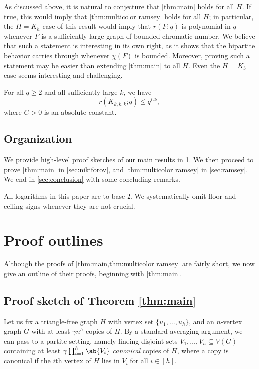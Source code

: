 As discussed above, it is natural to conjecture that \cref{thm:main} holds for all $H$. If true, this would imply that \cref{thm:multicolor ramsey} holds for all $H$; in particular, the $H=K_h$ case of this result would imply that $r(F;q)$ is polynomial in $q$ whenever $F$ is a sufficiently large graph of bounded chromatic number. We believe that such a statement is interesting in its own right, as it shows that the bipartite behavior carries through whenever $\chi(F)$ is bounded. Moreover, proving such a statement may be easier than extending \cref{thm:main} to all $H$. Even the $H=K_3$ case seems interesting and challenging.
\begin{conjecture}
    For all $q \geq 2$ and all sufficiently large $k$, we have
    \[
        r(K_{k,k,k};q) \leq q^{Ck},
    \]
    where $C>0$ is an absolute constant.
\end{conjecture}

\subsection{Organization}
We provide high-level proof sketches of our main results in \cref{sec:outlines}.
We then proceed to prove \cref{thm:main} in \cref{sec:nikiforov}, and \cref{thm:multicolor ramsey} in \cref{sec:ramsey}. We end in \cref{sec:conclusion} with some concluding remarks.

All logarithms in this paper are to base $2$. We systematically omit floor and ceiling signs whenever they are not crucial.

\section{Proof outlines}\label{sec:outlines}
Although the proofs of \cref{thm:main,thm:multicolor ramsey} are fairly short, we now give an outline of their proofs, beginning with \cref{thm:main}. 
\subsection{Proof sketch of Theorem \ref{thm:main}}
Let us fix a triangle-free graph $H$ with vertex set $\{u_1,\dots,u_h\}$, and an $n$-vertex graph $G$ with at least $\gamma n^h$ copies of $H$. By a standard averaging argument, we can pass to a partite setting, namely finding disjoint sets $V_1,\dots,V_h \subseteq V(G)$ containing at least $\gamma \prod_{i=1}^h \ab{V_i}$ \emph{canonical} copies of $H$, where a copy is canonical if the $i$th vertex of $H$ lies in $V_i$ for all $i \in [h]$.

